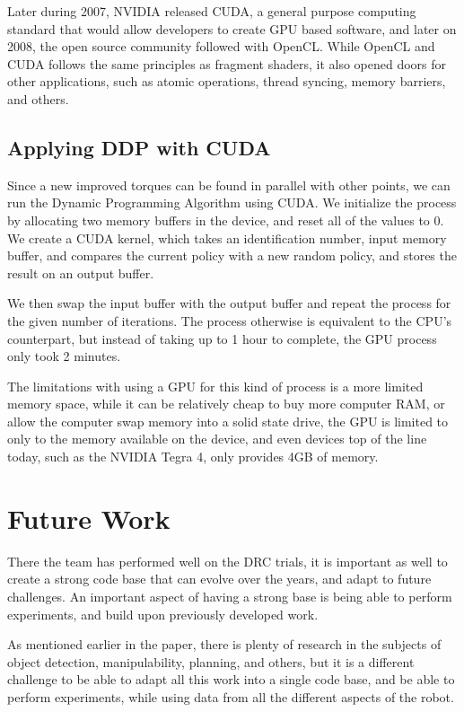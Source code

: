 \documentclass[12pt]{report}
\begin{document}
Later during 2007, NVIDIA released CUDA, a general purpose computing standard that would allow developers to create GPU based software, and later on 2008, the open source community followed with OpenCL. While OpenCL and CUDA follows the same principles as fragment shaders, it also opened doors for other applications, such as atomic operations, thread syncing, memory barriers, and others.

\section{Applying DDP with CUDA}
Since a new improved torques can be found in parallel with other points, we can run the Dynamic Programming Algorithm using CUDA.  We initialize the process by allocating two memory buffers in the device, and reset all of the values to 0.  We create a CUDA kernel, which takes an identification number, input memory buffer, and compares the current policy with a new random policy, and stores the result on an output buffer. 

We then swap the input buffer with the output buffer and repeat the process for the given number of iterations.  The process otherwise is equivalent to the CPU’s counterpart, but instead of taking up to 1 hour to complete, the GPU process only took 2 minutes. 

The limitations with using a GPU for this kind of process is a more limited memory space, while it can be relatively cheap to buy more computer RAM, or allow the computer swap memory into a solid state drive, the GPU is limited to only to the memory available on the device, and even devices top of the line today, such as the NVIDIA Tegra 4, only provides 4GB of memory. 

\chapter{Future Work}

There the team has performed well on the DRC trials, it is important as well to create a strong code base that can evolve over the years, and adapt to future challenges. An important aspect of having a strong base is being able to perform experiments, and build upon previously developed work. 


As mentioned earlier in the paper, there is plenty of research in the subjects of object detection, manipulability, planning, and others, but it is a different challenge to be able to adapt all this work into a single code base, and be able to perform experiments, while using data from all the different aspects of the robot. 
\end{document}
